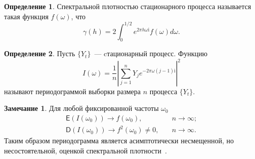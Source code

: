 \documentclass[specialist,
substylefile = spbu_report.rtx,
subf,href,colorlinks=true, 12pt]{disser}
\theoremstyle{definition}
\newtheorem{definition}{Определение}[chapter]
\newtheorem{remark}{Замечание}[chapter]
\newcommand{\im}{\mathrm{i}}
\begin{document}
\begin{definition}
	Спектральной плотностью стационарного процесса называется такая функция $f(\omega)$, что
	\[
		\gamma(h)=2\int_{0}^{1/2} e^{2\pi h\omega\im}f(\omega)d\omega.
	\]
\end{definition}
\begin{definition}
	Пусть $\{Y_t\}$~--- cтационарный процесс. Функцию
	\begin{equation}\label{eq:pgram}	
		I(\omega)=\frac1n\left|\sum_{j=1}^{n} Y_je^{-2\pi \omega (j-1)\mathrm{i}}\right|^2
	\end{equation}
	называют периодограммой выборки размера $n$ процесса $\{Y_t\}$.
\end{definition}
\begin{remark}
	Для любой фиксированной частоты $\omega_0$
	\begin{align*}
		\mathsf{E}\left(I(\omega_0)\right)\to f(\omega_0),\quad       & n\to \infty; \\
		\mathsf{D}\left(I(\omega_0)\right)\to f^2(\omega_0)\ne0,\quad & n\to\infty.
	\end{align*}
	Таким образом периодограмма является асимптотически несмещенной, но несостоятельной, оценкой спектральной плотности~\cite[Раздел 4.5]{Hassler2018}.
\end{remark}
\end{document}
